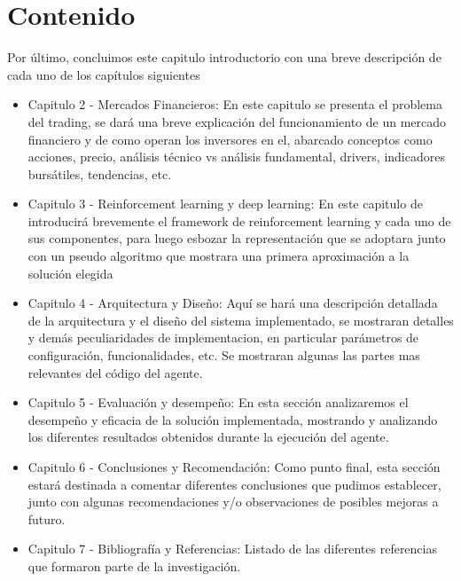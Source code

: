 \section{Contenido}
Por último, concluimos este capitulo introductorio con una breve descripción de cada uno de los capítulos siguientes

\begin{itemize} %
	\item Capitulo 2 - Mercados Financieros: En este capitulo se presenta el problema del trading, se dará una breve explicación del funcionamiento de un mercado financiero y de como operan los inversores en el, abarcado conceptos como acciones, precio, análisis técnico vs análisis fundamental, drivers, indicadores bursátiles, tendencias, etc.
	\item Capitulo 3 - Reinforcement learning y deep learning: En este capitulo de introducirá brevemente el framework de reinforcement learning y cada uno de sus componentes, para luego esbozar la representación que se adoptara junto con un pseudo algoritmo que mostrara una primera aproximación a la solución elegida
	\item Capitulo 4 - Arquitectura y Diseño: Aquí se hará una descripción detallada de la arquitectura y el diseño del sistema implementado, se mostraran detalles y demás peculiaridades de implementacion, en particular parámetros de configuración, funcionalidades, etc. Se mostraran algunas las partes mas relevantes del código del agente.
	\item Capitulo 5 - Evaluación y desempeño: En esta sección analizaremos el desempeño y eficacia de la solución implementada, mostrando y analizando los diferentes resultados obtenidos durante la ejecución del agente.
	\item Capitulo 6 - Conclusiones y Recomendación: Como punto final, esta sección estará destinada a comentar diferentes conclusiones que pudimos establecer, junto con algunas recomendaciones y/o observaciones de posibles mejoras a futuro.
	\item Capitulo 7 - Bibliografía y Referencias: Listado de las diferentes referencias que formaron parte de la investigación.
\end{itemize}